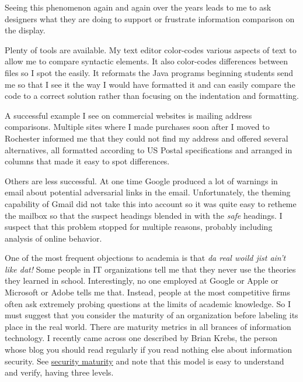 Seeing this phenomenon again and again over the years leads to me to ask
designers what they are doing to support or frustrate information
comparison on the display.

Plenty of tools are available. My text editor color-codes various
aspects of text to allow me to compare syntactic elements. It also
color-codes differences between files so I spot the easily. It reformats
the Java programs beginning students send me so that I see it the way I
would have formatted it and can easily compare the code to a correct
solution rather than focusing on the indentation and formatting.

A successful example I see on commercial websites is mailing address
comparisons. Multiple sites where I made purchases soon after I moved to
Rochester informed me that they could not find my address and offered
several alternatives, all formatted according to US Postal
specifications and arranged in columns that made it easy to spot
differences.

Others are less successful. At one time Google produced a lot of
warnings in email about potential adversarial links in the email.
Unfortunately, the theming capability of Gmail did not take this into
account so it was quite easy to retheme the mailbox so that the suspect
headings blended in with the \emph{safe} headings. I suspect that this
problem stopped for multiple reasons, probably including analysis of
online behavior.

\hypertarget{organizational-maturity}{%
\label{organizational-maturity}}

One of the most frequent objections to academia is that \emph{da real
woild jist ain't like dat!} Some people in IT organizations tell me that
they never use the theories they learned in school. Interestingly, no
one employed at Google or Apple or Microsoft or Adobe tells me that.
Instead, people at the most competitive firms often ask extremely
probing questions at the limits of academic knowledge. So I must suggest
that you consider the maturity of an organization before labeling its
place in the real world. There are maturity metrics in all brances of
information technology. I recently came across one described by Brian
Krebs, the person whose blog you should read regularly if you read
nothing else about information security. See
\href{http://krebsonsecurity.com/2015/04/whats-your-security-maturity-level/}{security
maturity} and note that this model is easy to understand and verify,
having three levels.

